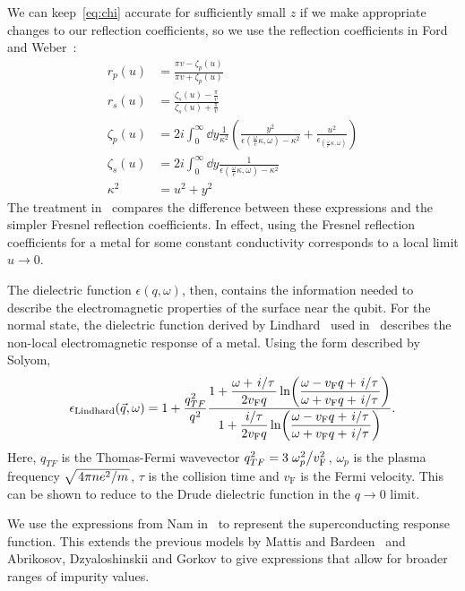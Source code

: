 \documentclass{article}
\newcommand{\vf}{v_{\mathrm{F}}}
\begin{document}
We can keep~\eqref{eq:chi} accurate for sufficiently small $z$ if we make appropriate changes to our reflection coefficients\cite{QubitRelax,Henkel2006}, so 
we use the reflection coefficients in Ford and Weber~\cite{Ford1984}:
\begin{align}
	r_p(u) &= \frac{\pi v - \zeta_p(u)}{\pi v + \zeta_p(u)} \\
	r_s(u) &= \frac{\zeta_s(u) - \frac{\pi}{v}}{\zeta_s(u) + \frac{\pi}{v}} \\
	\zeta_p(u) &= 2i \int_0^\infty \dd{y} \frac{1}{\kappa^2} \left( \frac{y^2}{\epsilon(\frac{\omega}{c}\kappa, \omega) - \kappa^2} + \frac{u^2}{\epsilon_(\frac{\omega}{c}\kappa, \omega)} \right) \label{eq:zp} \\
	\zeta_s(u) &= 2i \int_0^\infty \dd{y} \frac{1}{\epsilon(\frac{\omega}{c}\kappa, \omega) - \kappa^2} \label{eq:zs} \\
	\kappa^2 &= u^2 + y^2
\end{align}
The treatment in~\cite{QubitRelax} compares the difference between these expressions and the simpler Fresnel reflection coefficients.
In effect, using the Fresnel reflection coefficients for a metal for some constant conductivity corresponds to a local limit $u \rightarrow 0$.

The dielectric function $\epsilon(q, \omega)$, then, contains the information needed to describe the electromagnetic properties of the surface near the qubit.
For the normal state, the dielectric function derived by Lindhard~\cite{Lindhard} used in~\cite{QubitRelax} describes the non-local electromagnetic response of a metal.
Using the form described by Solyom\cite{SolyomV3},
\begin{equation}
	\epsilon_{\mathrm{Lindhard}}(\vec{q}, \omega) = 1 + \frac{q_{TF}^2}{q^2}\frac{\displaystyle 1 + \frac{\omega + \flatfrac{i}{\tau}}{2 \vf q} \ln(\frac{\omega - \vf q + \flatfrac{i}{\tau}}{\omega + \vf q + \flatfrac{i}{\tau}})}{\displaystyle 1 + \frac{\flatfrac{i}{\tau}}{2 \vf q} \ln(\frac{\omega - \vf q + \flatfrac{i}{\tau}}{\omega + \vf q + \flatfrac{i}{\tau}})}. \label{eq:lindhardsolyom}
\end{equation}
Here, $q_{TF}$ is the Thomas-Fermi wavevector $q_{TF}^2 = 3 \flatfrac{\omega_p^2}{\vf^2}$, $\omega_p$ is the plasma frequency $\sqrt{\flatfrac{4 \pi n e^2}{m}}$, $\tau$ is the collision time and $\vf$ is the Fermi velocity.
This can be shown to reduce to the Drude dielectric function in the $q \rightarrow 0$ limit.

We use the expressions from Nam in~\cite{Nam1967} to represent the superconducting response function.
This extends the previous models by Mattis and Bardeen~\cite{Mattis} and Abrikosov, Dzyaloshinskii and Gorkov\cite{AGD} to give expressions that allow for broader ranges of impurity values.
\end{document}
